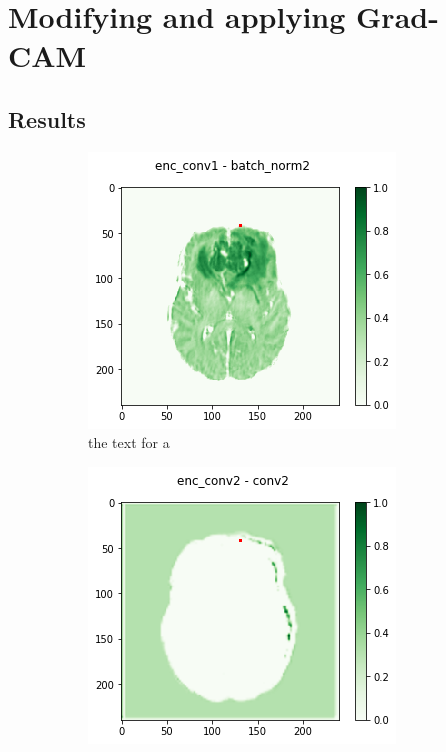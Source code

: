 \section{Modifying and applying Grad-CAM}

\subsection{Results}

\begin{figure}[H]
    \centering
    \begin{subfigure}{.33\textwidth}
        \centering
        \includegraphics[width=\linewidth]{chapters/04_segmentation/images/grad_cam_03.png}
        \caption{ the text for a}
    \end{subfigure}%
    \begin{subfigure}{.33\textwidth}
        \centering
        \includegraphics[width=\linewidth]{chapters/04_segmentation/images/grad_cam_05.png}

\end{subfigure}
\end{figure}
